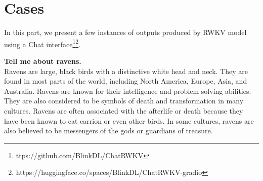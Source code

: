 \documentclass[11pt]{article}
\begin{document}




\section{Cases} \label{sec:appendix-cases}
In this part, we present a few instances of outputs produced by RWKV model using a Chat interface\footnote{ttps://github.com/BlinkDL/ChatRWKV}\footnote{https://huggingface.co/spaces/BlinkDL/ChatRWKV-gradio}. 





\begin{tcolorbox}[colback=white,colframe=black!75!black,title=RWKV-4-Raven-14B]
\textbf{Tell me about ravens.}\\

Ravens are large, black birds with a distinctive white head and neck. They are found in most parts of the world, including North America, Europe, Asia, and Australia. Ravens are known for their intelligence and problem-solving abilities. They are also considered to be symbols of death and transformation in many cultures. Ravens are often associated with the afterlife or death because they have been known to eat carrion or even other birds. In some cultures, ravens are also believed to be messengers of the gods or guardians of treasure.\\
\end{tcolorbox}
\end{document}
